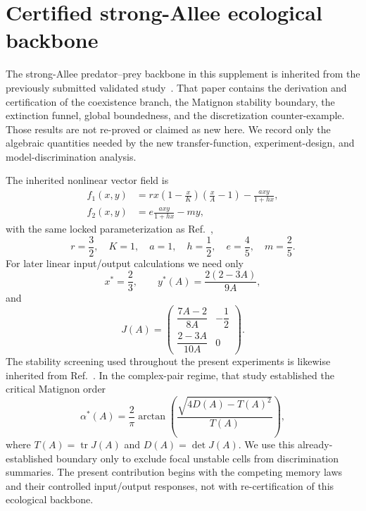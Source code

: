 \section{Certified strong-Allee ecological backbone}
\label{sec:backbone}

The strong-Allee predator--prey backbone in this supplement is inherited from the previously submitted validated study~\cite{P01}. That paper contains the derivation and certification of the coexistence branch, the Matignon stability boundary, the extinction funnel, global boundedness, and the discretization counter-example. Those results are not re-proved or claimed as new here. We record only the algebraic quantities needed by the new transfer-function, experiment-design, and model-discrimination analysis.

The inherited nonlinear vector field is
\begin{align}
    f_1(x,y) &= r x \left(1-\frac{x}{K}\right)\left(\frac{x}{A}-1\right)-\frac{axy}{1+hx}, \\
    f_2(x,y) &= e \frac{axy}{1+hx} - m y,
\end{align}
with the same locked parameterization as Ref.~\cite{P01},
\[
r=\frac{3}{2},\quad K=1,\quad a=1,\quad h=\frac{1}{2},\quad e=\frac{4}{5},\quad m=\frac{2}{5}.
\]
For later linear input/output calculations we need only
\[
x^* = \frac{2}{3}, \qquad y^*(A) = \frac{2(2-3A)}{9A},
\]
and
\[
J(A) = \begin{pmatrix}
\dfrac{7A-2}{8A} & -\dfrac{1}{2} \\[1.2ex]
\dfrac{2-3A}{10A} & 0
\end{pmatrix}.
\]
The stability screening used throughout the present experiments is likewise inherited from Ref.~\cite{P01}. In the complex-pair regime, that study established the critical Matignon order
\[
\alpha^*(A)=\frac{2}{\pi}\arctan\!\left(\frac{\sqrt{4D(A)-T(A)^2}}{T(A)}\right),
\]
where $T(A)=\operatorname{tr}J(A)$ and $D(A)=\det J(A)$. We use this already-established boundary only to exclude focal unstable cells from discrimination summaries. The present contribution begins with the competing memory laws and their controlled input/output responses, not with re-certification of this ecological backbone.

